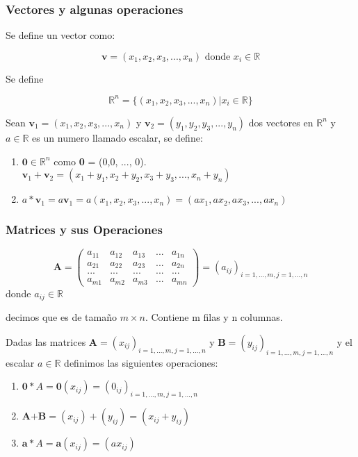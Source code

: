 \begin{frame}\frametitle{Vectores y algunas operaciones} 

Se define un vector como:

$$
\textbf{v} = (x_1, x_2, x_3, ..., x_n) \text{ donde } x_i \in \mathbb{R}
$$

Se define

$$
\mathbb{R}^n = \{(x_1, x_2, x_3, ..., x_n) | x_i \in \mathbb{R} \}
$$ 

\end{frame}

\begin{frame} %

Sean $\textbf{v}_1 = (x_1, x_2, x_3, ..., x_n)$ y $\textbf{v}_2 = (y_1, y_2, y_3, ..., y_n)$  
dos vectores en $\mathbb{R}^n$ y $a \in \mathbb{R}$ es un numero llamado escalar, se define:

\begin{enumerate}
\item $\textbf{0} \in \mathbb{R}^n$ como \textbf{0} = (0,0, ..., 0).
\iten $\textbf{v}_1 + \textbf{v}_2 = (x_1+y_1, x_2+y_2, x_3+y_3, ..., x_n+y_n)$
\item $a * \textbf{v}_1 = a \textbf{v}_1 = a(x_1, x_2, x_3, ..., x_n) = (ax_1, ax_2, ax_3, ..., ax_n)$
\end{enumerate}

\end{frame}

\begin{frame}\frametitle{Matrices y sus Operaciones} %

$$
\textbf{A} = \begin{pmatrix}
a_{11} & a_{12} & a_{13} & ...  & a_{1n} \\
a_{21} & a_{22} & a_{23} & ...  & a_{2n} \\
... & ... & ... & ... & ... \\
a_{m1} & a_{m2} & a_{m3} & ...  & a_{mn} 
\end{pmatrix} = (a_{ij})_{i=1,...,m, j=1,...,n}
$$ donde $a_{ij} \in \mathbb{R}$

decimos que es de tamaño $m \times n$. Contiene m filas y n columnas.

\end{frame}

\begin{frame} %

Dadas las matrices  $\textbf{A} = (x_{ij})_{i=1,...,m, j=1,...,n}$ y  $\textbf{B} = (y_{ij})_{i=1,...,m, j=1,...,n}$ y el escalar $a \in \mathbb{R}$ definimos las
siguientes operaciones:

\begin{enumerate}
\item $\textbf{0}*A = \textbf{0} (x_{ij}) = (0_{ij})_{i=1,...,m, j=1,...,n}$
\item $\textbf{A+B} = (x_{ij}) + (y_{ij}) = (x_{ij} + y_{ij})$
\item $\textbf{a}*A = \textbf{a} (x_{ij}) = (ax_{ij})$
\end{enumerate}

\end{frame}

\begin{frame} %


\end{frame}

